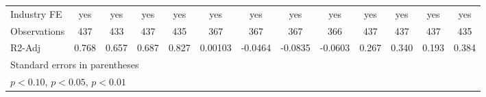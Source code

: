 \begin{table}[htbp]
\begin{tabular}{l*{12}{c}}
Industry FE         &         yes         &         yes         &         yes         &         yes         &         yes         &         yes         &         yes         &         yes         &         yes         &         yes         &         yes         &         yes         \\
Observations        &         437         &         433         &         437         &         435         &         367         &         367         &         367         &         366         &         437         &         437         &         437         &         435         \\
R2-Adj              &       0.768         &       0.657         &       0.687         &       0.827         &     0.00103         &     -0.0464         &     -0.0835         &     -0.0603         &       0.267         &       0.340         &       0.193         &       0.384         \\
\hline\hline
\multicolumn{13}{l}{\footnotesize Standard errors in parentheses}\\
\multicolumn{13}{l}{\footnotesize \sym{*} \(p<0.10\), \sym{**} \(p<0.05\), \sym{***} \(p<0.01\)}\\
\end{tabular}
\end{table}
